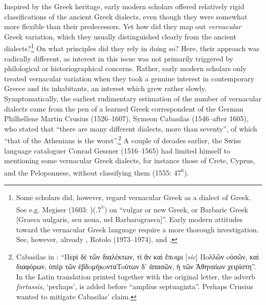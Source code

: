 Inspired by the Greek heritage, early modern scholars offered relatively rigid classifications of the ancient Greek dialects, even though they were somewhat more flexible than their predecessors. Yet how did they map out \textit{vernacular} Greek variation, which they usually distinguished clearly from the ancient dialects?\footnote{Some scholars did, however, regard vernacular Greek as a dialect of Greek. See e.g. Megiser (1603: )(.7\textsc{\textsuperscript{v}}) on “vulgar or new Greek, or Barbaric Greek [Graeca uulgaris, seu noua, uel Barbarograeca]”. Early modern attitudes toward the vernacular Greek language require a more thorough investigation. See, however, already \citet{Caratzas1952}, Rotolo (1973–1974), and \citet{Toufexis2005}.} On what principles did they rely in doing so? Here, their approach was radically different, as interest in this issue was not primarily triggered by philological or historiographical concerns. Rather, early modern scholars only treated vernacular variation when they took a genuine interest in contemporary Greece and its inhabitants, an interest which grew rather slowly. Symptomatically, the earliest rudimentary estimation of the number of vernacular dialects came from the pen of a learned Greek correspondent of the German Philhellene Martin Crusius (1526–1607), Symeon Cabasilas (1546–after 1605), who stated that “there are many different dialects, more than seventy”, of which “that of the Athenians is the worst”.\footnote{Cabasilas in \citet[461]{Crusius1584}: “Περὶ δὲ τῶν διαλέκτων, τί ἂν καὶ ἔπoιμι [\textit{sic}] Πoλλῶν oὐσῶν, καὶ διαφόρων, ὑπὲρ τῶν ἑβδoμήκoνταToύτων δ' ἁπασῶν, ἡ τῶν Ἀθηναίων χειρίστη”. In the Latin translation printed together with the original letter, the adverb \textit{fortassis}, ‘perhaps’, is added before “amplius septuaginta”. Perhaps Crusius wanted to mitigate Cabasilas’ claim.} A couple of decades earlier, the Swiss language cataloguer Conrad Gessner (1516–1565) had limited himself to mentioning some vernacular Greek dialects, for instance those of Crete, Cyprus, and the Peloponnese, without classifying them (1555: 47\textsc{\textsuperscript{r}}).

